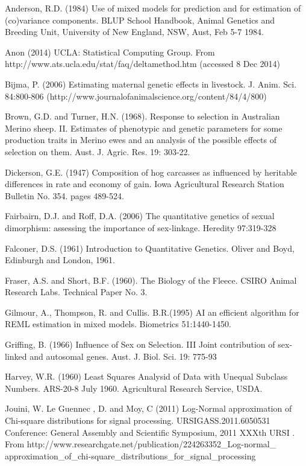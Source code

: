 \documentclass[titlepage]{article}  %
\begin{document}
\clearpage
\begin{thebibliography}{99}

Anderson, R.D. (1984) Use of mixed models for prediction and for estimation 
    of (co)variance components. BLUP School Handbook, Animal Genetics and
    Breeding Unit, University of New England, NSW, Aust, Feb 5-7 1984.

Anon (2014) UCLA: Statistical Computing Group. 
    From http://www.ats.ucla.edu/stat/faq/deltamethod.htm (accessed 8 Dec 2014)

Bijma, P. (2006) Estimating maternal genetic effects in livestock.
    J. Anim. Sci. 84:800-806
    (http://www.journalofanimalscience.org/content/84/4/800)

Brown, G.D. and Turner, H.N. (1968).  Response to selection in Australian
    Merino sheep.  II. Estimates of phenotypic and genetic parameters for
    some production traits in Merino ewes and an analysis of the possible
    effects of selection on them.  Aust. J. Agric. Res. 19: 303-22.

Dickerson, G.E. (1947) Composition of hog carcasses as influenced by heritable
    differences in rate and economy of gain. Iowa Agricultural Research
    Station Bulletin No. 354. pages 489-524.

Fairbairn, D.J. and Roff, D.A. (2006) The quantitative genetics of sexual 
    dimorphism: assessing the importance of sex-linkage. Heredity 97:319-328

Falconer, D.S. (1961) Introduction to Quantitative Genetics.
    Oliver and Boyd, Edinburgh and London, 1961.

Fraser, A.S. and Short, B.F. (1960).  The Biology of the Fleece.  CSIRO
    Animal Research Labs.  Technical Paper No. 3.

Gilmour, A., Thompson, R. and Cullis. B.R.(1995) AI an efficient algorithm 
    for REML estimation in mixed models. Biometrics 51:1440-1450.

Griffing, B. (1966) Influence of Sex on Selection.
    III Joint contribution of sex-linked and autosomal genes.
    Aust. J. Biol. Sci. 19: 775-93
 
Harvey, W.R. (1960) Least Squares Analysid of Data with Unequal Subclass
    Numbers. ARS-20-8 July 1960. Agricultural Research Service, USDA.

Jouini, W. Le Guennec , D. and Moy, C  (2011) Log-Normal approximation of
    Chi-square distributions for signal processing. 
    URSIGASS.2011.6050531 Conference: General Assembly and Scientific Symposium,
    2011 XXXth URSI .
    From http://www.researchgate.net/publication/224263352\_Log-normal\_
    approximation\_of\_chi-square\_distributions\_for\_signal\_processing


\end{thebibliography}
\end{document}
